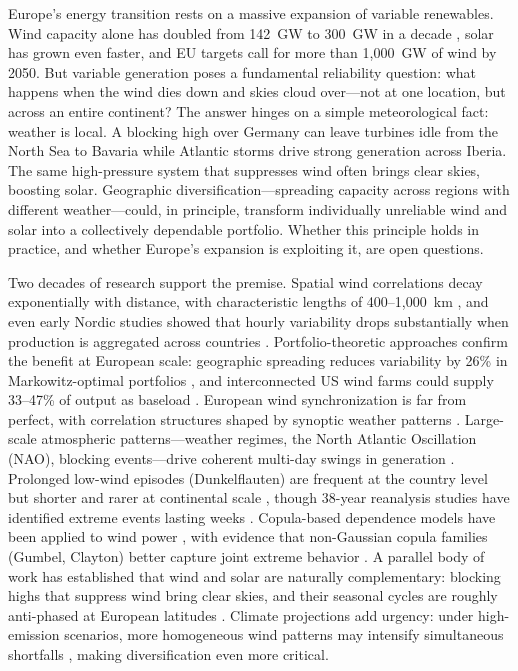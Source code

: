 \documentclass{article}
\begin{document}
Europe's energy transition rests on a massive expansion of variable renewables. Wind capacity alone has doubled from \SI{142}{\giga\watt} to \SI{300}{\giga\watt} in a decade \citep{windeurope2024}, solar has grown even faster, and EU targets call for more than 1,000~GW of wind by 2050. But variable generation poses a fundamental reliability question: what happens when the wind dies down and skies cloud over---not at one location, but across an entire continent? The answer hinges on a simple meteorological fact: weather is local. A blocking high over Germany can leave turbines idle from the North Sea to Bavaria while Atlantic storms drive strong generation across Iberia. The same high-pressure system that suppresses wind often brings clear skies, boosting solar. Geographic diversification---spreading capacity across regions with different weather---could, in principle, transform individually unreliable wind and solar into a collectively dependable portfolio. Whether this principle holds in practice, and whether Europe's expansion is exploiting it, are open questions.

Two decades of research support the premise. Spatial wind correlations decay exponentially with distance, with characteristic lengths of 400--1,000~km \citep{malvaldi2017,olauson2016,tong2021}, and even early Nordic studies showed that hourly variability drops substantially when production is aggregated across countries \citep{holttinen2005wind}. Portfolio-theoretic approaches confirm the benefit at European scale: geographic spreading reduces variability by 26\% in Markowitz-optimal portfolios \citep{lopezprol2024,roques2010,drake2007,markowitz1952}, and interconnected US wind farms could supply 33--47\% of output as baseload \citep{archer2007}. European wind synchronization is far from perfect, with correlation structures shaped by synoptic weather patterns \citep{monforti2016}. Large-scale atmospheric patterns---weather regimes, the North Atlantic Oscillation (NAO), blocking events---drive coherent multi-day swings in generation \citep{grams2017,brayshaw2011,bloomfield2020,vanderwiel2019weather}. Prolonged low-wind episodes (Dunkelflauten) are frequent at the country level but shorter and rarer at continental scale \citep{raynaud2018,kaspar2019,vanderwiel2019meteo}, though 38-year reanalysis studies have identified extreme events lasting weeks \citep{kittel2026}. Copula-based dependence models have been applied to wind power \citep{papaefthymiou2009,hagspiel2012}, with evidence that non-Gaussian copula families (Gumbel, Clayton) better capture joint extreme behavior \citep{louie2014}. A parallel body of work has established that wind and solar are naturally complementary: blocking highs that suppress wind bring clear skies, and their seasonal cycles are roughly anti-phased at European latitudes \citep{heide2010,huber2014,pfenninger2016}. Climate projections add urgency: under high-emission scenarios, more homogeneous wind patterns may intensify simultaneous shortfalls \citep{wohland_more_2017,qu2025}, making diversification even more critical.
\end{document}
